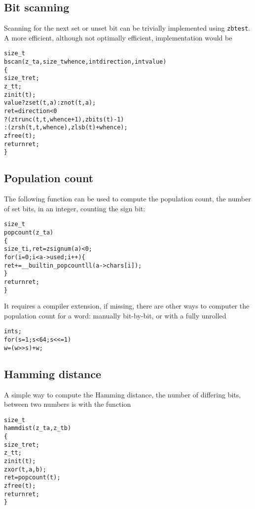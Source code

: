 \subsection{Bit scanning}
\label{sec:Bit scanning}

Scanning for the next set or unset bit can be
trivially implemented using {\tt zbtest}. A
more efficient, although not optimally efficient,
implementation would be

\begin{alltt}
   size_t
   bscan(z_t a, size_t whence, int direction, int value)
   \{
       size_t ret;
       z_t t;
       zinit(t);
       value ? zset(t, a) : znot(t, a);
       ret = direction < 0
           ? (ztrunc(t, t, whence + 1), zbits(t) - 1)
           : (zrsh(t, t, whence), zlsb(t) + whence);
       zfree(t);
       return ret;
   \}
\end{alltt}


\subsection{Population count}
\label{sec:Population count}

The following function can be used to compute
the population count, the number of set bits,
in an integer, counting the sign bit:

\begin{alltt}
   size_t
   popcount(z_t a)
   \{
       size_t i, ret = zsignum(a) < 0;
       for (i = 0; i < a->used; i++) \{
           ret += __builtin_popcountll(a->chars[i]);
       \}
       return ret;
   \}
\end{alltt}

\noindent
It requires a compiler extension, if missing,
there are other ways to computer the population
count for a word: manually bit-by-bit, or with
a fully unrolled

\begin{alltt}
   int s;
   for (s = 1; s < 64; s <<= 1)
       w = (w >> s) + w;
\end{alltt}


\subsection{Hamming distance}
\label{sec:Hamming distance}

A simple way to compute the Hamming distance,
the number of differing bits, between two
numbers is with the function

\begin{alltt}
   size_t
   hammdist(z_t a, z_t b)
   \{
       size_t ret;
       z_t t;
       zinit(t);
       zxor(t, a, b);
       ret = popcount(t);
       zfree(t);
       return ret;
   \}
\end{alltt}

